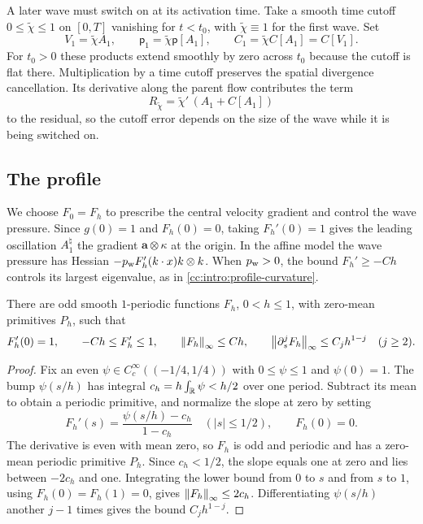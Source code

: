 A later wave must switch on at its activation time. Take a smooth time
cutoff $0\le\widetilde\chi\le1$ on $[0,T]$ vanishing for $t<t_0$,
with $\widetilde\chi\equiv1$ for the first wave. Set
\begin{equation}\label{cc:uf:hier:eq:switched}
 V_1=\widetilde\chi A_1,\qquad
 \mathsf p_1=\widetilde\chi\mathsf p[A_1],\qquad
 C_1=\widetilde\chi C[A_1]=C[V_1].
\end{equation}
For $t_0>0$ these products extend smoothly by zero across $t_0$
because the cutoff is flat there. Multiplication by a time cutoff preserves
the spatial divergence cancellation. Its derivative along the parent
flow contributes the term
\begin{equation}\label{cc:uf:hier:eq:switch}
 R_{\widetilde\chi}=\widetilde\chi'\,(A_1+C[A_1])
\end{equation}
to the residual, so the cutoff error depends on the size of the wave
while it is being switched on.

\subsection{The profile}\label{cc:sec:profile}
We choose $F_0=F_h$ to prescribe the central velocity gradient and
control the wave pressure. Since $g(0)=1$ and $F_h(0)=0$, taking
$F_h'(0)=1$ gives the leading oscillation $A_1^\natural$ the gradient
$\mathbf a\otimes\kappa$ at the origin. In the affine model the wave
pressure has Hessian $-p_{\rm w}F_h'(k\cdot x)k\otimes k$. When $p_{\rm w}>0$,
the bound $F_h'\ge-Ch$ controls its largest eigenvalue, as in
\eqref{cc:intro:profile-curvature}.

\begin{lemma}\label{cc:uf:exact:lem:profile}
There are odd smooth \(1\)-periodic functions
\(F_h\), \(0<h\le1\), with zero-mean primitives \(P_h\), such that
\[
 F_h'(0)=1,\qquad -Ch\le F_h'\le1,\qquad
 \left\lVert F_h\right\rVert_\infty\le Ch,\qquad
 \left\lVert\partial_s^jF_h\right\rVert_\infty\le C_jh^{1-j}\quad(j\ge2).
\]
\end{lemma}
\begin{proof}
Fix an even $\psi\in C_c^\infty((-1/4,1/4))$ with $0\le\psi\le1$ and
$\psi(0)=1$. The bump $\psi(s/h)$ has integral
$c_h=h\int_{\mathbb R}\psi<h/2$ over one period. Subtract its mean to obtain a
periodic primitive, and normalize the slope at zero by setting
\[
 F_h'(s)=\frac{\psi(s/h)-c_h}{1-c_h}\quad(|s|\le1/2),\qquad F_h(0)=0.
\]
The derivative is even with mean zero, so $F_h$ is odd and periodic
and has a zero-mean periodic primitive $P_h$.
Since $c_h<1/2$, the slope equals one at zero and lies between $-2c_h$
and one. Integrating the lower bound from $0$ to $s$ and from $s$ to $1$,
using $F_h(0)=F_h(1)=0$, gives $\left\lVert F_h\right\rVert_\infty\le 2c_h$.
Differentiating $\psi(s/h)$ another $j-1$ times gives the bound $C_jh^{1-j}$.
\end{proof}
